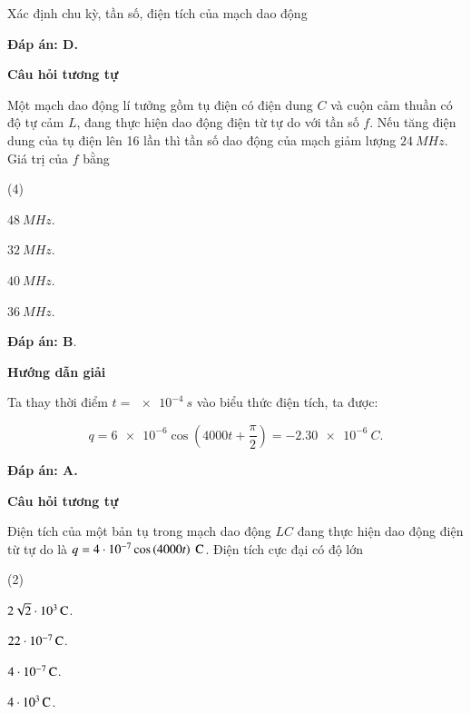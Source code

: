 \begin{dang}{Xác định chu kỳ, tần số, điện tích của mạch dao động}
{		\textbf{Đáp án: D.}
		
		\begin{center}
			\textbf{Câu hỏi tương tự}
		\end{center}
		
		Một mạch dao động lí tưởng gồm tụ điện có điện dung $C$ và cuộn cảm thuần có độ tự cảm $L$, đang thực hiện dao động điện từ tự do với tần số $f$. Nếu tăng điện dung của tụ điện lên 16 lần thì tần số dao động của mạch giảm lượng $\SI{24}{MHz}$. Giá trị của $f$ bằng
		\begin{mcq}(4)
			\item $\SI{48}{MHz}$. 
			\item $\SI{32}{MHz}$. 
			\item $\SI{40}{MHz}$. 
			\item $\SI{36}{MHz}$. 
		\end{mcq}
		
		\textbf{Đáp án: B}.
	}
	{	\begin{center}
			\textbf{Hướng dẫn giải}
		\end{center}
		
		Ta thay thời điểm $t = \SI{e-4}{s}$ vào biểu thức điện tích, ta được:
		
		$$ q = \num{6e-6} \cos \left( 4000t + \dfrac{\pi}{2} \right) = -\SI{2,30 e-6}{C}.$$
		
		\textbf{Đáp án: A.}
		
		\begin{center}
			\textbf{Câu hỏi tương tự}
		\end{center}
		
		Điện tích của một bản tụ trong mạch dao động $LC$ đang thực hiện dao động điện từ tự do là $q = 4\cdot10^{-7} \cos \left( 4000t \right)\ \text C$. Điện tích cực đại có độ lớn
		\begin{mcq}(2)
			\item $\xsi{2\sqrt{2}\cdot10^{3}}{C}$. 
			\item $\xsi{22\cdot10^{-7}}{C}$. 
			\item $\xsi{4\cdot10^{-7}}{C}$. 
			\item $\xsi{4\cdot10^{3}}{C}$. 
		\end{mcq}
		
}
\end{dang}
